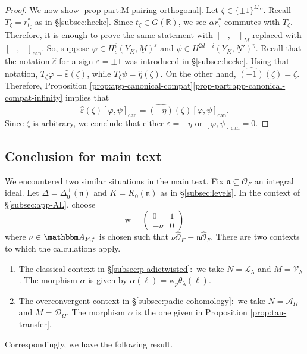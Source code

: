 \documentclass[10pt, twoside]{amsart}
\theoremstyle{plain}
\theoremstyle{definition}
\theoremstyle{remark}
\numberwithin{equation}{subsection}
\def\R{\mathbb R}
\def\A{\mathbbm A}
\def\can{\mathrm{can}}
\def\can{\mathrm{can}}
\def\gn{\mathfrak n}
\def\scro{\mathscr O}
\def\scra{\mathscr A}
\def\scrd{\mathscr D}
\def\scrl{\mathscr L}
\def\scrv{\mathscr V}
\def\scro{\mathscr O}
\begin{document}
\begin{appendix}
\begin{proof}
We now show \ref{prop-part:M-pairing-orthogonal}. Let $\zeta \in \{\pm 1\}^{\Sigma_\infty}$. Recall $T_{\zeta} = r_{t_\zeta}^{\ast}$ as in \S \ref{subsec:hecke}. Since $t_\zeta \in G(\R)$, we see $\alpha r_\tau^{\ast}$ commutes with $T_\zeta$. Therefore, it is enough to prove the same statement with $[-,-]_M$ replaced with $[-,-]_{\can}$. So, suppose $\varphi \in H^i_c(Y_K,\underline M)^{\varepsilon}$ and $\psi \in H^{2d-i}(Y_K,\underline N')^{\eta}$. Recall that the notation $\widehat{\varepsilon}$ for a sign $\varepsilon=\pm 1$ was introduced in \S \ref{subsec:hecke}. Using that notation, $T_\zeta \varphi = \widehat{\varepsilon}(\zeta)$, while $T_\zeta\psi = \widehat{\eta}(\zeta)$. On the other hand, $\widehat{(-1)}(\zeta) = \zeta$. Therefore, Proposition \ref{prop:app-canonical-compat}\ref{prop-part:app-canonical-compat-infinity} implies that
$$
\widehat{\varepsilon}(\zeta)[\varphi,\psi]_{\can} = \widehat{(-\eta)}(\zeta)[\varphi,\psi]_{\can}.
$$
Since $\zeta$ is arbitrary, we conclude that either $\varepsilon = -\eta$ or $[\varphi,\psi]_{\can} = 0$.
\end{proof}

\subsection{Conclusion for main text}

We encountered two similar situations in the main text. Fix $\gn \subseteq \scro_F$ an integral ideal. Let $\Delta=\Delta_0^+(\gn)$ and $K=K_0(\gn)$ as in \S \ref{subsec:levels}. In the context of \S\ref{subsec:app-AL}, choose
$$
{{ \boldsymbol{\mathrm{w}}}} = \begin{pmatrix} 0 & 1 \\ -\nu & 0 \end{pmatrix}
$$
where $\nu \in \A_{F,f}$ is chosen such that $\nu\widehat{\scro}_F = \gn \widehat{\scro}_F$. There are two contexts to which the calculations apply.
\begin{enumerate}[label=(\arabic*)]
\item The classical context in \S \ref{subsec:p-adictwisted}:\ we take $N = \scrl_\lambda$ and $M = \scrv_\lambda$. The morphism $\alpha$ is given by $\alpha(\ell) = {{ \boldsymbol{\mathrm{w}}}}_p \theta_\lambda(\ell)$.
\item The overconvergent context in \S \ref{subsec:padic-cohomology}:\ we take $N = \scra_{\Omega}$ and $M = \scrd_\Omega$. The morphism $\alpha$ is the one given in Proposition \ref{prop:tau-transfer}.
\end{enumerate}
Correspondingly, we have the following result.


\end{appendix}
\end{document}
